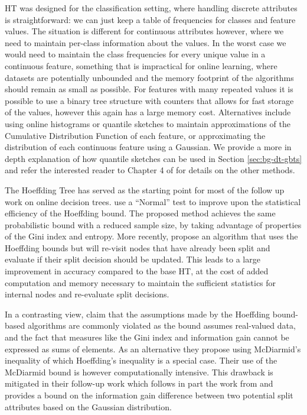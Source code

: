 HT was designed for the classification setting, where handling discrete attributes
is straightforward: we can just keep a table of frequencies for classes and feature
values. The situation
is different for continuous attributes however, where we need to maintain per-class
information about the values. In the worst case we would need to maintain the class
frequencies for every unique value in a continuous feature, something that is impractical
for online learning, where datasets are potentially unbounded and the memory footprint
of the algorithms should remain as small as possible. For features with many repeated
values it is possible to use a binary tree structure with counters that allows for
fast storage of the values, however this again has a large memory cost. Alternatives include
using online histograms or quantile sketches \cite{greenwald2016quantiles}
to maintain approximations of the Cumulative Distribution Function of
each feature, or approximating the distribution of each continuous feature using a Gaussian.
We provide a more in depth explanation of how quantile sketches can be used
in Section \ref{sec:bg-dt-gbts} and refer the interested reader to Chapter 4 of \citet{data-stream-mining} for details on the other methods.

The Hoeffding Tree has served as the starting point for most of the follow up work on
online decision trees. \citet{vfdt-normal} use a ``Normal'' test to improve
upon the statistical efficiency of the Hoeffding bound. The proposed method achieves
the same probabilistic bound with a reduced sample size, by taking
advantage of properties of the Gini index and entropy. More recently,
\citet{efdt} propose an algorithm that uses the Hoeffding bounds but
will re-visit nodes that have already been split and evaluate if their
split decision should be updated. This leads to a large improvement in accuracy
compared to the base HT,
at the cost of added computation and memory necessary to maintain
the sufficient statistics for internal nodes and re-evaluate split
decisions.

In a contrasting view, \citet{vfdt-mcdiarmid} claim that the assumptions made
by the Hoeffding bound-based algorithms are commonly violated as the bound assumes
real-valued data, and the fact that measures like the Gini index and information
gain cannot be expressed as sums of elements. As an alternative they propose
using McDiarmid's inequality of which Hoeffding's inequality is a special case.
Their use of the McDiarmid
bound is however computationally intensive. This drawback is mitigated
in their follow-up work \cite{vfdt-gaussian} which follows in part the work from \citet{vfdt-normal}
and provides a bound on the information gain difference between two potential
split attributes based on the Gaussian distribution.


